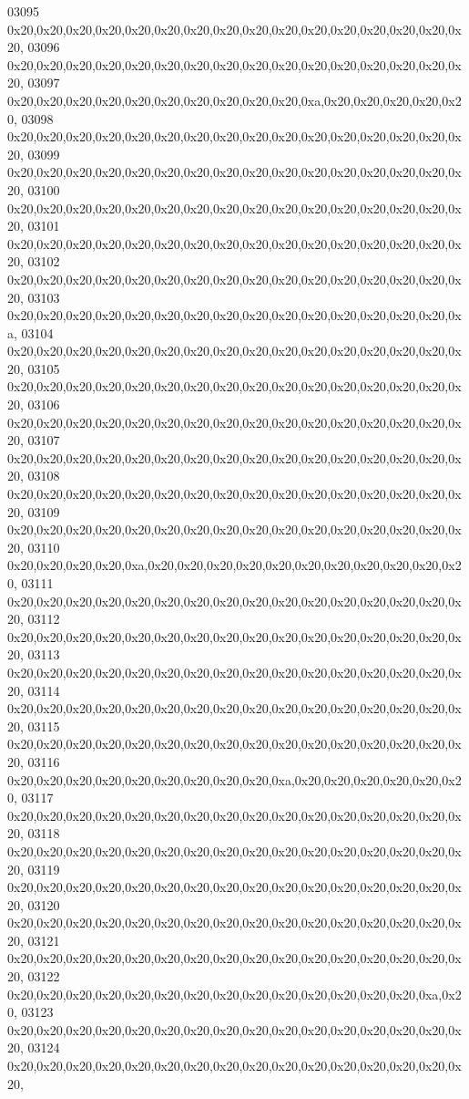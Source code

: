 \begin{DoxyCode}
03095   0x20,0x20,0x20,0x20,0x20,0x20,0x20,0x20,0x20,0x20,0x20,0x20,0x20,0x20,0x20,0x20,
03096   0x20,0x20,0x20,0x20,0x20,0x20,0x20,0x20,0x20,0x20,0x20,0x20,0x20,0x20,0x20,0x20,
03097   0x20,0x20,0x20,0x20,0x20,0x20,0x20,0x20,0x20,0x20,0xa,0x20,0x20,0x20,0x20,0x20,
03098   0x20,0x20,0x20,0x20,0x20,0x20,0x20,0x20,0x20,0x20,0x20,0x20,0x20,0x20,0x20,0x20,
03099   0x20,0x20,0x20,0x20,0x20,0x20,0x20,0x20,0x20,0x20,0x20,0x20,0x20,0x20,0x20,0x20,
03100   0x20,0x20,0x20,0x20,0x20,0x20,0x20,0x20,0x20,0x20,0x20,0x20,0x20,0x20,0x20,0x20,
03101   0x20,0x20,0x20,0x20,0x20,0x20,0x20,0x20,0x20,0x20,0x20,0x20,0x20,0x20,0x20,0x20,
03102   0x20,0x20,0x20,0x20,0x20,0x20,0x20,0x20,0x20,0x20,0x20,0x20,0x20,0x20,0x20,0x20,
03103   0x20,0x20,0x20,0x20,0x20,0x20,0x20,0x20,0x20,0x20,0x20,0x20,0x20,0x20,0x20,0xa,
03104   0x20,0x20,0x20,0x20,0x20,0x20,0x20,0x20,0x20,0x20,0x20,0x20,0x20,0x20,0x20,0x20,
03105   0x20,0x20,0x20,0x20,0x20,0x20,0x20,0x20,0x20,0x20,0x20,0x20,0x20,0x20,0x20,0x20,
03106   0x20,0x20,0x20,0x20,0x20,0x20,0x20,0x20,0x20,0x20,0x20,0x20,0x20,0x20,0x20,0x20,
03107   0x20,0x20,0x20,0x20,0x20,0x20,0x20,0x20,0x20,0x20,0x20,0x20,0x20,0x20,0x20,0x20,
03108   0x20,0x20,0x20,0x20,0x20,0x20,0x20,0x20,0x20,0x20,0x20,0x20,0x20,0x20,0x20,0x20,
03109   0x20,0x20,0x20,0x20,0x20,0x20,0x20,0x20,0x20,0x20,0x20,0x20,0x20,0x20,0x20,0x20,
03110   0x20,0x20,0x20,0x20,0xa,0x20,0x20,0x20,0x20,0x20,0x20,0x20,0x20,0x20,0x20,0x20,
03111   0x20,0x20,0x20,0x20,0x20,0x20,0x20,0x20,0x20,0x20,0x20,0x20,0x20,0x20,0x20,0x20,
03112   0x20,0x20,0x20,0x20,0x20,0x20,0x20,0x20,0x20,0x20,0x20,0x20,0x20,0x20,0x20,0x20,
03113   0x20,0x20,0x20,0x20,0x20,0x20,0x20,0x20,0x20,0x20,0x20,0x20,0x20,0x20,0x20,0x20,
03114   0x20,0x20,0x20,0x20,0x20,0x20,0x20,0x20,0x20,0x20,0x20,0x20,0x20,0x20,0x20,0x20,
03115   0x20,0x20,0x20,0x20,0x20,0x20,0x20,0x20,0x20,0x20,0x20,0x20,0x20,0x20,0x20,0x20,
03116   0x20,0x20,0x20,0x20,0x20,0x20,0x20,0x20,0x20,0xa,0x20,0x20,0x20,0x20,0x20,0x20,
03117   0x20,0x20,0x20,0x20,0x20,0x20,0x20,0x20,0x20,0x20,0x20,0x20,0x20,0x20,0x20,0x20,
03118   0x20,0x20,0x20,0x20,0x20,0x20,0x20,0x20,0x20,0x20,0x20,0x20,0x20,0x20,0x20,0x20,
03119   0x20,0x20,0x20,0x20,0x20,0x20,0x20,0x20,0x20,0x20,0x20,0x20,0x20,0x20,0x20,0x20,
03120   0x20,0x20,0x20,0x20,0x20,0x20,0x20,0x20,0x20,0x20,0x20,0x20,0x20,0x20,0x20,0x20,
03121   0x20,0x20,0x20,0x20,0x20,0x20,0x20,0x20,0x20,0x20,0x20,0x20,0x20,0x20,0x20,0x20,
03122   0x20,0x20,0x20,0x20,0x20,0x20,0x20,0x20,0x20,0x20,0x20,0x20,0x20,0x20,0xa,0x20,
03123   0x20,0x20,0x20,0x20,0x20,0x20,0x20,0x20,0x20,0x20,0x20,0x20,0x20,0x20,0x20,0x20,
03124   0x20,0x20,0x20,0x20,0x20,0x20,0x20,0x20,0x20,0x20,0x20,0x20,0x20,0x20,0x20,0x20,

\end{DoxyCode}
